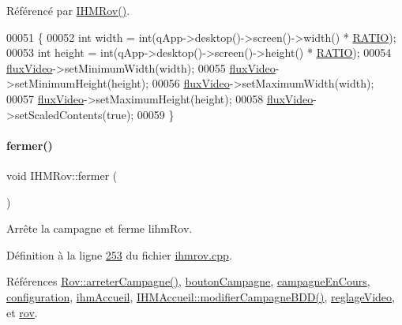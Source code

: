 Référencé par \hyperlink{ihmrov_8cpp_source_l00015}{I\+H\+M\+Rov()}.


\begin{DoxyCode}
00051 \{    
00052     \textcolor{keywordtype}{int} width = int(qApp->desktop()->screen()->width() * \hyperlink{ihmrov_8h_a7e8b3c8482e593df0ace933ad3de22ee}{RATIO});
00053     \textcolor{keywordtype}{int} height = int(qApp->desktop()->screen()->height() * \hyperlink{ihmrov_8h_a7e8b3c8482e593df0ace933ad3de22ee}{RATIO});
00054     \hyperlink{class_i_h_m_rov_acdeabe02e1431b5c1817cb2a89debd0a}{fluxVideo}->setMinimumWidth(width);
00055     \hyperlink{class_i_h_m_rov_acdeabe02e1431b5c1817cb2a89debd0a}{fluxVideo}->setMinimumHeight(height);
00056     \hyperlink{class_i_h_m_rov_acdeabe02e1431b5c1817cb2a89debd0a}{fluxVideo}->setMaximumWidth(width);
00057     \hyperlink{class_i_h_m_rov_acdeabe02e1431b5c1817cb2a89debd0a}{fluxVideo}->setMaximumHeight(height);
00058     \hyperlink{class_i_h_m_rov_acdeabe02e1431b5c1817cb2a89debd0a}{fluxVideo}->setScaledContents(\textcolor{keyword}{true});
00059 \}
\end{DoxyCode}
\mbox{\label{class_i_h_m_rov_ac0c8c09dc2ef1c06e1008647dcd2d6b8}} 
\paragraph{\texorpdfstring{fermer()}{fermer()}}
{\footnotesize\ttfamily void I\+H\+M\+Rov\+::fermer (\begin{DoxyParamCaption}{ }\end{DoxyParamCaption})\hspace{0.3cm}{\ttfamily [private]}}



Arrête la campagne et ferme l\textquotesingle{}ihm\+Rov. 



Définition à la ligne \hyperlink{ihmrov_8cpp_source_l00253}{253} du fichier \hyperlink{ihmrov_8cpp_source}{ihmrov.\+cpp}.



Références \hyperlink{rov_8cpp_source_l00136}{Rov\+::arreter\+Campagne()}, \hyperlink{ihmrov_8h_source_l00057}{bouton\+Campagne}, \hyperlink{ihmrov_8h_source_l00045}{campagne\+En\+Cours}, \hyperlink{ihmrov_8h_source_l00049}{configuration}, \hyperlink{ihmrov_8h_source_l00046}{ihm\+Accueil}, \hyperlink{ihmaccueil_8cpp_source_l00295}{I\+H\+M\+Accueil\+::modifier\+Campagne\+B\+D\+D()}, \hyperlink{ihmrov_8h_source_l00048}{reglage\+Video}, et \hyperlink{ihmrov_8h_source_l00047}{rov}.




